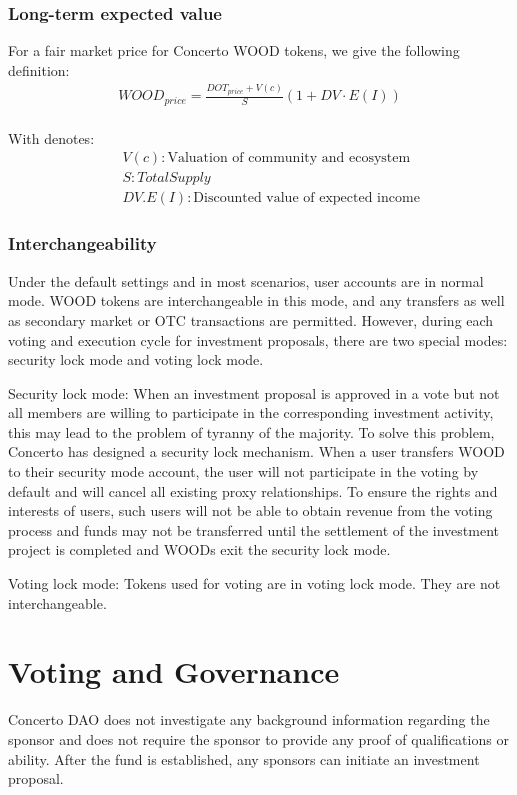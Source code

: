 \documentclass[UTF8]{article}
\begin{document}
\begin{multicols}{2}
\subsubsection{Long-term expected value}
For a fair market price for Concerto WOOD tokens, we give the following definition:
\begin{eqnarray*}
WOOD_{price} = \frac{DOT_{price} + V(c)}{S} (1 + DV\cdot E(I))\\
\end{eqnarray*}

With denotes:
\begin{eqnarray*}
  &&  V(c): \text{Valuation of community and ecosystem}\\
  && S: Total Supply\\
  && DV.E(I): \text{Discounted value of expected income}
\end{eqnarray*}

\subsubsection{Interchangeability}
Under the default settings and in most scenarios, user accounts are in normal mode. WOOD tokens are interchangeable in this mode, and any transfers as well as secondary market or OTC transactions are permitted. However, during each voting and execution cycle for investment proposals, there are two special modes: security lock mode and voting lock mode.

Security lock mode: When an investment proposal is approved in a vote but not all members are willing to participate in the corresponding investment activity, this may lead to the problem of tyranny of the majority. To solve this problem, Concerto has designed a security lock mechanism. When a user transfers WOOD to their security mode account, the user will not participate in the voting by default and will cancel all existing proxy relationships. To ensure the rights and interests of users, such users will not be able to obtain revenue from the voting process and funds may not be transferred until the settlement of the investment project is completed and WOODs exit the security lock mode.

Voting lock mode: Tokens used for voting are in voting lock mode. They are not interchangeable.

\section{Voting and Governance}
Concerto DAO does not investigate any background information regarding the sponsor and does not require the sponsor to provide any proof of qualifications or ability. After the fund is established, any sponsors can initiate an investment proposal.


\end{multicols}
\end{document}
